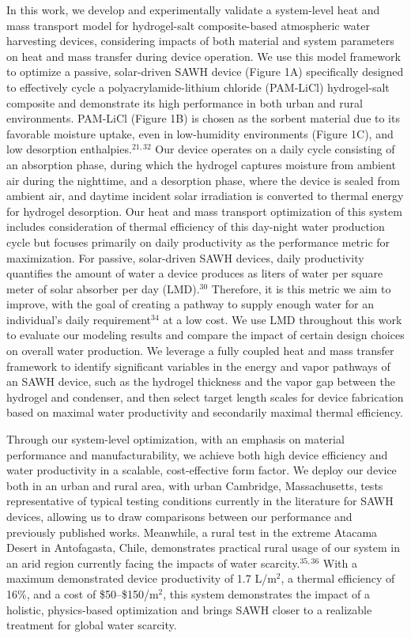 \documentclass[11pt]{article}
\begin{document}
In this work, we develop and experimentally validate a system-level heat and mass transport model for hydrogel-salt composite-based atmospheric water harvesting devices, considering impacts of both material and system parameters on heat and mass transfer during device operation. We use this model framework to optimize a passive, solar-driven SAWH device (Figure 1A) specifically designed to effectively cycle a polyacrylamide-lithium chloride (PAM-LiCl) hydrogel-salt composite and demonstrate its high performance in both urban and rural environments. PAM-LiCl (Figure 1B) is chosen as the sorbent material due to its favorable moisture uptake, even in low-humidity environments (Figure 1C), and low desorption enthalpies.$^{21,32}$ Our device operates on a daily cycle consisting of an absorption phase, during which the hydrogel captures moisture from ambient air during the nighttime, and a desorption phase, where the device is sealed from ambient air, and daytime incident solar irradiation is converted to thermal energy for hydrogel desorption. Our heat and mass transport optimization of this system includes consideration of thermal efficiency of this day-night water production cycle but focuses primarily on daily productivity as the performance metric for maximization. For passive, solar-driven SAWH devices, daily productivity quantifies the amount of water a device produces as liters of water per square meter of solar absorber per day (LMD).$^{30}$ Therefore, it is this metric we aim to improve, with the goal of creating a pathway to supply enough water for an individual's daily requirement$^{34}$ at a low cost. We use LMD throughout this work to evaluate our modeling results and compare the impact of certain design choices on overall water production. We leverage a fully coupled heat and mass transfer framework to identify significant variables in the energy and vapor pathways of an SAWH device, such as the hydrogel thickness and the vapor gap between the hydrogel and condenser, and then select target length scales for device fabrication based on maximal water productivity and secondarily maximal thermal efficiency.

Through our system-level optimization, with an emphasis on material performance and manufacturability, we achieve both high device efficiency and water productivity in a scalable, cost-effective form factor. We deploy our device both in an urban and rural area, with urban Cambridge, Massachusetts, tests representative of typical testing conditions currently in the literature for SAWH devices, allowing us to draw comparisons between our performance and previously published works. Meanwhile, a rural test in the extreme Atacama Desert in Antofagasta, Chile, demonstrates practical rural usage of our system in an arid region currently facing the impacts of water scarcity.$^{35,36}$ With a maximum demonstrated device productivity of 1.7 L/m$^{2}$, a thermal efficiency of 16\%, and a cost of \$50--\$150/m$^{2}$, this system demonstrates the impact of a holistic, physics-based optimization and brings SAWH closer to a realizable treatment for global water scarcity.
\end{document}
